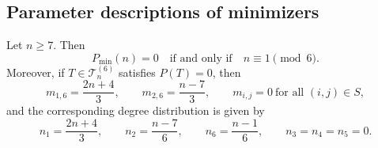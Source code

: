 \documentclass[preprint,12pt]{elsarticle}
\begin{document}
\subsection{Parameter descriptions of minimizers}
\label{subsec:param}



\begin{theorem}
\label{thm:delta6-P0}
Let $n\ge 7$.
Then
\[
P_{\min}(n)=0
\quad\text{if and only if}\quad
n\equiv 1 \pmod 6.
\]
Moreover, if $T\in\mathcal{T}_n^{( 6)}$ satisfies $P(T)=0$, then
\[
m_{1,6}=\frac{2n+4}{3},\qquad
m_{2,6}=\frac{n-7}{3},\qquad
m_{i,j}=0 \ \text{for all }(i,j)\in S,
\]
and the corresponding degree distribution is given by
\[
n_1=\frac{2n+4}{3},\qquad
n_2=\frac{n-7}{6},\qquad
n_6=\frac{n-1}{6},\qquad
n_3=n_4=n_5=0.
\]
\end{theorem}
\end{document}
